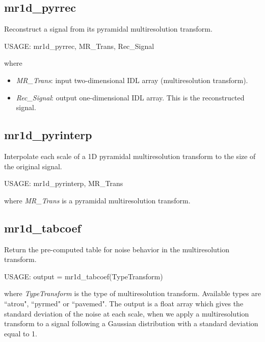 \subsection{mr1d\_pyrrec}
Reconstruct a signal from its pyramidal multiresolution transform.
{\bf
\begin{center}
     USAGE: mr1d\_pyrrec, MR\_Trans, Rec\_Signal
\end{center}}
where 
\begin{itemize}
\item {\em MR\_Trans}: input two-dimensional IDL array (multiresolution transform).
\item {\em Rec\_Signal}: output one-dimensional IDL array. This 
is the reconstructed signal.
\end{itemize}
 
\subsection{mr1d\_pyrinterp}
Interpolate each scale of a 1D pyramidal multiresolution transform to the size
of the original signal.
{\bf
\begin{center}
     USAGE: mr1d\_pyrinterp, MR\_Trans
\end{center}}
where {\em MR\_Trans} is a pyramidal multiresolution transform.


\subsection{mr1d\_tabcoef}
Return the pre-computed table for noise behavior in the multiresolution 
transform.
{\bf
\begin{center}
     USAGE: output =  mr1d\_tabcoef(TypeTransform)
\end{center}}
where {\em TypeTransform} is the type of multiresolution transform. Available
types are ``atrou", ``pyrmed" or ``pavemed". The output is a float array which
gives the standard deviation of the noise at each scale, when we apply
a multiresolution transform to a signal following a Gaussian distribution 
with a standard deviation equal to 1. 
 
